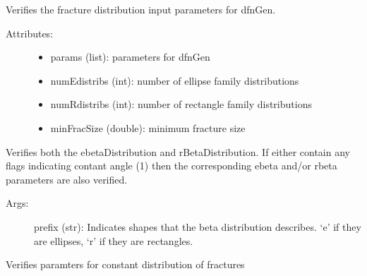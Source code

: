 \documentclass[letterpaper,10pt,english]{sphinxmanual}
\begin{document}
\begin{fulllineitems}
\label{\detokenize{pydfnworks:pydfnworks.distributions.distr}}
Verifies the fracture distribution input parameters for dfnGen.
\begin{description}
\item[{Attributes:}] \leavevmode\begin{itemize}
\item {} 
params (list): parameters for dfnGen

\item {} 
numEdistribs (int): number of ellipse family distributions

\item {} 
numRdistribs (int): number of rectangle family distributions

\item {} 
minFracSize (double): minimum fracture size

\end{itemize}

\end{description}

\begin{fulllineitems}
\label{\detokenize{pydfnworks:pydfnworks.distributions.distr.beta_distribution}}
Verifies both the \sphinxquotedblleft{}ebetaDistribution\sphinxquotedblright{} and \sphinxquotedblleft{}rBetaDistribution\sphinxquotedblright{}. If either contain any flags
indicating contant angle (1) then the corresponding \sphinxquotedblleft{}ebeta\sphinxquotedblright{} and/or \sphinxquotedblleft{}rbeta\sphinxquotedblright{} parameters are 
also verified.
\begin{description}
\item[{Args:}] \leavevmode
prefix (str): Indicates shapes that the beta distribution describes. `e' if they are ellipses, `r' if they are rectangles.

\end{description}

\end{fulllineitems}


\begin{fulllineitems}
\label{\detokenize{pydfnworks:pydfnworks.distributions.distr.constant_dist}}
Verifies paramters for constant distribution of fractures


\end{fulllineitems}
\end{fulllineitems}
\end{document}
